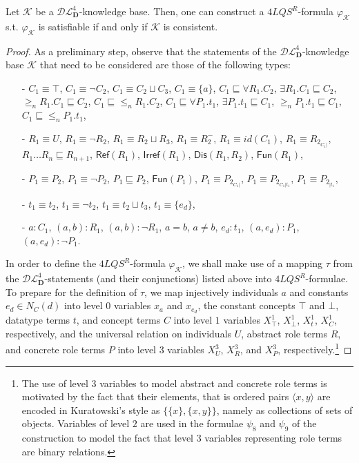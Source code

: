 \documentclass[a4paper]{llncs}
\newcommand{\shdlss}{\mathcal{DL}_{\D}^{4}}
\newcommand{\flqsr}{\ensuremath{4LQS^R}}
\newcommand{\D}{\mathbf{D}}
\newcommand{\refl}{\mathsf{Ref}}
\newcommand{\irref}{\mathsf{Irref}}
\newcommand{\fun}{\mathsf{Fun}}
\begin{document}
\begin{theorem}\label{theorem}
Let $\mathcal{K}$ be a $\shdlss$-knowledge base. Then, one can construct a \flqsr-formula $\varphi_{\mathcal{K}}$ s.t. $\varphi_{\mathcal{K}}$ is satisfiable if and only if $\mathcal{K}$ is consistent.  \end{theorem}
\begin{proof}
As a preliminary step, observe that the statements of the $\shdlss$-knowledge base $\mathcal{K}$ that need to be considered  are those of the following types:
\begin{itemize}
\item[-] $C_1 \equiv \top$, $C_1 \equiv \neg C_2$, $C_1 \equiv C_2 \sqcup C_3$, $C_1 \equiv \{a\}$, $C_1 \sqsubseteq \forall R_1.C_2$, $\exists R_1.C_1 \sqsubseteq C_2$, $\geq_n\!\! R_1. C_1 \sqsubseteq C_2$, $C_1 \sqsubseteq {\leq_n\!\! R_1. C_2}$, $C_1 \sqsubseteq \forall P_1.t_1$, $\exists P_1.t_1 \sqsubseteq C_1$, $\geq_n\!\! P_1. t_1 \sqsubseteq C_1$, $C_1 \sqsubseteq {\leq_n\!\! P_1. t_1}$,
\item[-] $R_1 \equiv U$, $R_1 \equiv \neg R_2$, $R_1 \equiv R_2 \sqcup R_3$, $R_1 \equiv R_2^{-}$, $R_1 \equiv id(C_1)$, $R_1 \equiv R_{2_{C_1 |}}$, $R_1 \ldots R_n \sqsubseteq R_{n+1}$, $\refl(R_1)$, $\irref(R_1)$, $\mathsf{Dis}(R_1,R_2)$, $\fun(R_1)$,
\item[-] $P_1 \equiv P_2$, $P_1 \equiv \neg P_2$, $P_1 \sqsubseteq P_2$, $\fun(P_1)$, $P_1 \equiv P_{2_{C_1 |}}$, $P_1 \equiv P_{2_{C_1 | t_1}}$, $P_1 \equiv P_{2_{| t_1}}$,
\item[-] $t_1 \equiv t_2$, $t_1 \equiv \neg t_2$, $t_1 \equiv t_2 \sqcup t_3$, $t_1 \equiv \{e_d\}$,
\item[-] $a : C_1$, $(a,b) : R_1$, $(a,b) : \neg R_1$, $a=b$, $a \neq b$,
$e_{d} : t_1$, $(a, e_{d}) : P_1$, $(a, e_{d}) : \neg P_1$.
\end{itemize}
In order to define the \flqsr-formula $\varphi_{\mathcal{K}}$, we shall make use of a mapping $\tau$ from the $\shdlss$-statements (and their conjunctions) listed above into \flqsr-formulae. To prepare for the definition of $\tau$, we map injectively individuals $a$ and constants $e_d \in N_{C}(d)$ into level $0$ variables $x_a$ and $x_{e_d}$, the constant concepts $\top$ and $\bot$, datatype terms $t$, and concept terms $C$ into level $1$ variables $X_{\top}^1$, $X_{\bot}^1$, $X_{t}^1$, $X_{C}^1$, respectively, and the universal relation on individuals $U$, abstract role terms $R$, and concrete role terms $P$ into level $3$ variables $X_{U}^3$, $X_{R}^3$, and $X_{P}^3$, respectively.\footnote{The use of level $3$ variables to model abstract and concrete role terms is motivated by the fact that their elements, that is ordered pairs $\langle x, y \rangle$ are encoded in Kuratowski's style as $\{\{x\}, \{x,y\}\}$, namely as collections of sets of objects. Variables of level $2$ are used in the formulae $\psi_8$ and $\psi_9$ of the construction to model the fact that level $3$ variables representing role terms are binary relations.}



\end{proof}
\end{document}
